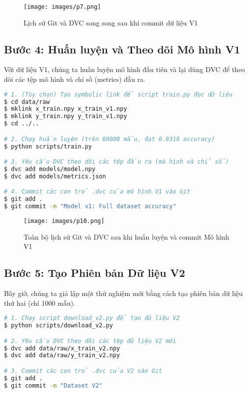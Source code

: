 \documentclass[11pt]{article}
\begin{document}
\begin{figure}[H]
    \centering
    \texttt{[image: images/p7.png]}
    \caption{Lịch sử Git và DVC song song sau khi commit dữ liệu V1}
\end{figure}

\subsection{Bước 4: Huấn luyện và Theo dõi Mô hình V1}
Với dữ liệu V1, chúng ta huấn luyện mô hình đầu tiên và lại dùng DVC để theo dõi các tệp mô hình và chỉ số (metrics) đầu ra.

\begin{lstlisting}[language=bash]
# 1. (Tùy chọn) Tạo symbolic link để script train.py đọc dữ liệu
$ cd data/raw
$ mklink x_train.npy x_train_v1.npy
$ mklink y_train.npy y_train_v1.npy
$ cd ../..

# 2. Chạy huấn luyện (trên 60000 mẫu, đạt 0.9319 accuracy)
$ python scripts/train.py

# 3. Yêu cầu DVC theo dõi các tệp đầu ra (mô hình và chỉ số)
$ dvc add models/model.npy
$ dvc add models/metrics.json

# 4. Commit các con trỏ .dvc của mô hình V1 vào Git
$ git add .
$ git commit -m "Model v1: Full dataset accuracy"
\end{lstlisting}

\begin{figure}[H]
    \centering
    \texttt{[image: images/p10.png]}
    \caption{Toàn bộ lịch sử Git và DVC sau khi huấn luyện và commit Mô hình V1}
\end{figure}


\subsection{Bước 5: Tạo Phiên bản Dữ liệu V2}
Bây giờ, chúng ta giả lập một thử nghiệm mới bằng cách tạo phiên bản dữ liệu thứ hai (chỉ 1000 mẫu).

\begin{lstlisting}[language=bash]
# 1. Chạy script download_v2.py để tạo dữ liệu V2
$ python scripts/download_v2.py

# 2. Yêu cầu DVC theo dõi các tệp dữ liệu V2 mới
$ dvc add data/raw/x_train_v2.npy
$ dvc add data/raw/y_train_v2.npy

# 3. Commit các con trỏ .dvc của V2 vào Git
$ git add .
$ git commit -m "Dataset V2"
\end{lstlisting}
\end{document}
